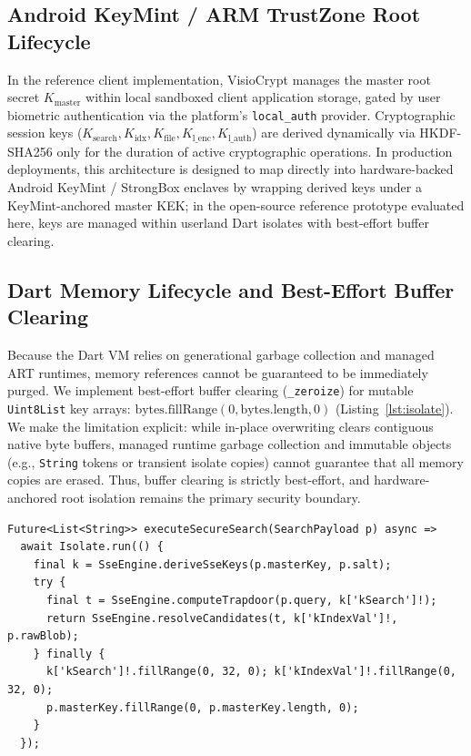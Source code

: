 \documentclass[10pt,conference]{IEEEtran}
\newenvironment{revised}{\color{revcolor}}{}
\newenvironment{revised}{\color{revcolor}}{}
\begin{document}
\begin{revised}
\subsection{Android KeyMint / ARM TrustZone Root Lifecycle}
In the reference client implementation, VisioCrypt manages the master root secret $K_{\text{master}}$ within local sandboxed client application storage, gated by user biometric authentication via the platform's \texttt{local\_auth} provider. Cryptographic session keys ($K_{\text{search}}, K_{\text{idx}}, K_{\text{file}}, K_{\text{l\_enc}}, K_{\text{l\_auth}}$) are derived dynamically via HKDF-SHA256 only for the duration of active cryptographic operations. In production deployments, this architecture is designed to map directly into hardware-backed Android KeyMint / StrongBox enclaves by wrapping derived keys under a KeyMint-anchored master KEK; in the open-source reference prototype evaluated here, keys are managed within userland Dart isolates with best-effort buffer clearing.

\subsection{Dart Memory Lifecycle and Best-Effort Buffer Clearing}
Because the Dart VM relies on generational garbage collection and managed ART runtimes, memory references cannot be guaranteed to be immediately purged. We implement best-effort buffer clearing (\texttt{\_zeroize}) for mutable \texttt{Uint8List} key arrays: $\text{bytes.fillRange}(0, \text{bytes.length}, 0)$ (Listing~\ref{lst:isolate}). We make the limitation explicit: while in-place overwriting clears contiguous native byte buffers, managed runtime garbage collection and immutable objects (e.g., \texttt{String} tokens or transient isolate copies) cannot guarantee that all memory copies are erased. Thus, buffer clearing is strictly best-effort, and hardware-anchored root isolation remains the primary security boundary.

\noindent\begin{minipage}{\columnwidth}
\begin{lstlisting}[style=dartstyle,caption={Isolated Worker Routine with Best-Effort Buffer Clearing},label={lst:isolate}]
Future<List<String>> executeSecureSearch(SearchPayload p) async =>
  await Isolate.run(() {
    final k = SseEngine.deriveSseKeys(p.masterKey, p.salt);
    try {
      final t = SseEngine.computeTrapdoor(p.query, k['kSearch']!);
      return SseEngine.resolveCandidates(t, k['kIndexVal']!, p.rawBlob);
    } finally {
      k['kSearch']!.fillRange(0, 32, 0); k['kIndexVal']!.fillRange(0, 32, 0);
      p.masterKey.fillRange(0, p.masterKey.length, 0);
    }
  });
\end{lstlisting}
\end{minipage}


\end{revised}
\end{document}
